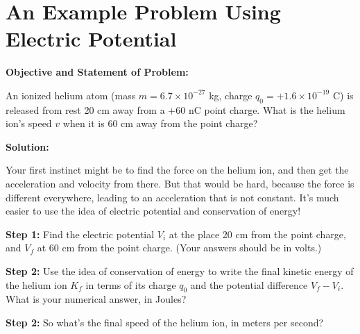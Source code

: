 \section{An Example Problem Using Electric Potential}

\begin{comment}
This lab is really just a worksheet I've used in my 132 class. --Matt Trawick, 6/2015
\end{comment}

\makelabheader %

\vspace{0.1in}
\textbf{Objective and Statement of Problem:}
 
An ionized helium atom (mass $m=6.7\times 10^{-27}$ kg, charge $q_0=+1.6\times 10^{-19}$ C) is released from rest 20 cm away from a +60 nC point charge.  What is the helium ion's speed $v$ when it is 60 cm away from the point charge?

\textbf{Solution:}

Your first instinct might be to find the force on the helium ion, and then get the acceleration and velocity from there.  But that would be hard, because the force is different everywhere, leading to an acceleration that is not constant.  It's much easier to use the idea of electric potential and conservation of energy!

\vspace{0.1in}

\textbf{Step 1:} \newline
Find the electric potential $V_i$ at the place 20 cm from the point charge, and $V_f$ at 60 cm from the point charge.  (Your answers should be in volts.)
\vspace{1.9in}


\textbf{Step 2:} \newline
Use the idea of conservation of energy to write the final kinetic energy of the helium ion $K_f$ in terms of its charge $q_0$ and the potential difference $V_f-V_i$.  What is your numerical answer, in Joules?
\vspace{1.6in}


\textbf{Step 2:} \newline
So what's the final speed of the helium ion, in meters per second?
\vspace{1.6in}
